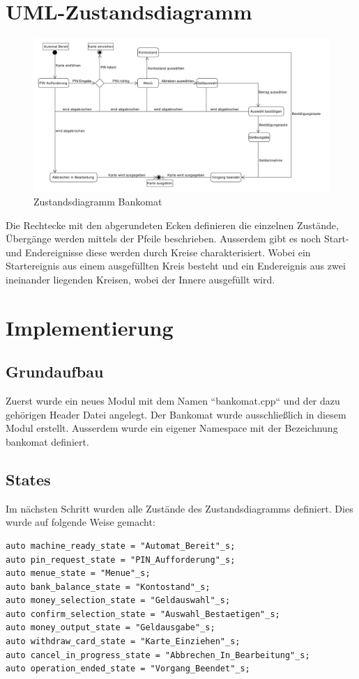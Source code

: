 \documentclass{report}
\begin{document}
\section{UML-Zustandsdiagramm}
\begin{figure}
  \centering
  \includegraphics[angle=-90, scale=0.44]{images/zustandsdiagramm_v2.pdf}
  \caption[Bankomat]{Zustandsdiagramm Bankomat} 
\end{figure}

Die Rechtecke mit den abgerundeten Ecken definieren die einzelnen Zustände, Übergänge werden mittels der Pfeile beschrieben. Ausserdem gibt es noch Start- und Endereignisse diese werden durch Kreise charakterisiert. Wobei ein Startereignis aus einem ausgefüllten Kreis besteht und ein Endereignis aus zwei ineinander liegenden Kreisen, wobei der Innere ausgefüllt wird.

\section{Implementierung}
\subsection{Grundaufbau}
Zuerst wurde ein neues Modul mit dem Namen ``bankomat.cpp`` und der dazu gehörigen Header Datei angelegt. Der Bankomat wurde ausschließlich in diesem Modul erstellt. Ausserdem wurde ein eigener Namespace mit der Bezeichnung bankomat definiert.


\subsection{States}
Im nächsten Schritt wurden alle Zustände des Zustandsdiagramms definiert. Dies wurde auf folgende Weise gemacht:
\begin{lstlisting}
auto machine_ready_state = "Automat_Bereit"_s;
auto pin_request_state = "PIN_Aufforderung"_s;
auto menue_state = "Menue"_s;
auto bank_balance_state = "Kontostand"_s;
auto money_selection_state = "Geldauswahl"_s;
auto confirm_selection_state = "Auswahl_Bestaetigen"_s;
auto money_output_state = "Geldausgabe"_s;
auto withdraw_card_state = "Karte_Einziehen"_s;
auto cancel_in_progress_state = "Abbrechen_In_Bearbeitung"_s;
auto operation_ended_state = "Vorgang_Beendet"_s;
\end{lstlisting}
\end{document}
